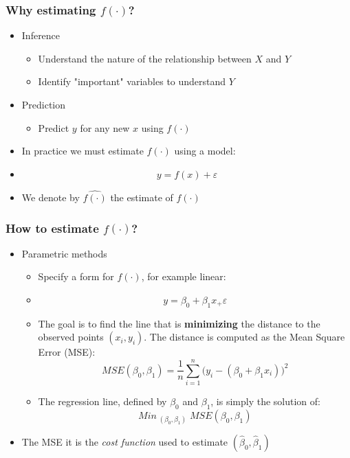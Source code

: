 \documentclass[xcolor=x11names,compress, aspectratio=169]{beamer}
\renewcommand{\(}{\begin{columns}}
\renewcommand{\)}{\end{columns}}
\newcommand{\<}[1]{\begin{column}{#1}}
\renewcommand{\>}{\end{column}}
\begin{document}
\begin{frame} %
\frametitle{Why estimating $f(\cdot)$?}
 \begin{itemize}
  \item<+-> Inference
   \begin{itemize}
  \item<+->[] Understand the nature of the relationship between $X$ and $Y$
  \item<+->[] Identify  "important" variables to understand $Y$
 \end{itemize}
  \item<+-> Prediction
   \begin{itemize}
  \item<+->[] Predict $y$ for any new $x$ using $f(\cdot)$
 \end{itemize}
 \item<+-> In practice we must estimate  $f(\cdot)$ using a model:
 \item<+->[] $$ y = f(x) + \varepsilon $$
 \item<+->[] We denote by $\widehat{f(\cdot)}$ the estimate of $f(\cdot)$
 \end{itemize}
\end{frame}


\begin{frame} %
\frametitle{How to estimate $f(\cdot)$?}
 \begin{itemize}
  \item<+-> Parametric methods
   \begin{itemize}
      \item<+->[] Specify a form for $f(\cdot)$, for example linear:
      \item<+->[] $$y = \beta_0 + \beta_1 x_ + \varepsilon$$
      \item<+-> The goal is to find the line that is  \textbf{minimizing} the distance to the observed points $(x_i, y_i)$.
                The distance is computed as the Mean Square Error (MSE): $$ MSE(\beta_0, \beta_1) = \frac{1}{n} \sum_{i=1}^{n} \bigl(y_i - (\beta_0 + \beta_1 x_i)\bigr)^2 $$
      \item<+-> The regression line, defined by $\beta_0$ and $\beta_1$,  is simply the solution of:
       $$Min_{\; (\beta_0 , \beta_1)} \; MSE(\beta_0, \beta_1) $$
   \end{itemize}
  \item<+->  The MSE it is the \textit{cost function} used to estimate $ (\widehat \beta_0, \widehat \beta_1)$
 \end{itemize}

\end{frame}
\end{document}
